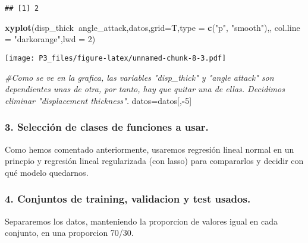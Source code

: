 \documentclass[]{article}
\newenvironment{Shaded}{\begin{snugshade}}{\end{snugshade}}
\newcommand{\KeywordTok}[1]{\textcolor[rgb]{0.13,0.29,0.53}{\textbf{#1}}}
\newcommand{\DataTypeTok}[1]{\textcolor[rgb]{0.13,0.29,0.53}{#1}}
\newcommand{\DecValTok}[1]{\textcolor[rgb]{0.00,0.00,0.81}{#1}}
\newcommand{\StringTok}[1]{\textcolor[rgb]{0.31,0.60,0.02}{#1}}
\newcommand{\CommentTok}[1]{\textcolor[rgb]{0.56,0.35,0.01}{\textit{#1}}}
\newcommand{\OperatorTok}[1]{\textcolor[rgb]{0.81,0.36,0.00}{\textbf{#1}}}
\newcommand{\NormalTok}[1]{#1}
\begin{document}
\begin{verbatim}
## [1] 2
\end{verbatim}

\begin{Shaded}
\begin{Highlighting}[]
\KeywordTok{xyplot}\NormalTok{(disp_thick}\OperatorTok{~}\NormalTok{angle_attack,datos,}\DataTypeTok{grid=}\NormalTok{T,}\DataTypeTok{type =} \KeywordTok{c}\NormalTok{(}\StringTok{"p"}\NormalTok{, }\StringTok{"smooth"}\NormalTok{),, }\DataTypeTok{col.line =} \StringTok{"darkorange"}\NormalTok{,}\DataTypeTok{lwd =} \DecValTok{2}\NormalTok{)}
\end{Highlighting}
\end{Shaded}

\texttt{[image: P3\_files/figure-latex/unnamed-chunk-8-3.pdf]}

\begin{Shaded}
\begin{Highlighting}[]
\CommentTok{#Como se ve en la grafica, las variables "disp_thick" y "angle attack" son dependientes unas de otra, por tanto, hay que quitar una de ellas. Decidimos eliminar "displacement thickness".}
\NormalTok{datos=datos[,}\OperatorTok{-}\DecValTok{5}\NormalTok{]}
\end{Highlighting}
\end{Shaded}

\subsubsection{3. Selección de clases de funciones a
usar.}\label{seleccion-de-clases-de-funciones-a-usar.-1}

Como hemos comentado anteriormente, usaremos regresión lineal normal en
un princpio y regresión lineal regularizada (con lasso) para compararlos
y decidir con qué modelo quedarnos.

\subsubsection{4. Conjuntos de training, validacion y test
usados.}\label{conjuntos-de-training-validacion-y-test-usados.-1}

Separaremos los datos, manteniendo la proporcion de valores igual en
cada conjunto, en una proporcion 70/30.
\end{document}

